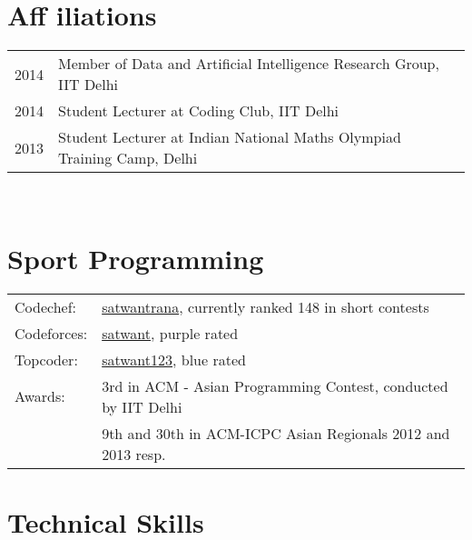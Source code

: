 \documentclass[a4paper,10pt]{article} %
\begin{document}

\section{Aff iliations}
\begin{tabular}{rl}
2014 & Member of Data and Artificial Intelligence Research Group, IIT Delhi \\
2014 & Student Lecturer at Coding Club, IIT Delhi\\
2013 & Student Lecturer at Indian National Maths Olympiad Training Camp, Delhi\\
\end{tabular}\\




\section{Sport Programming}

\begin{tabular}{ll}
Codechef: & \href{http://www.codechef.com/users/satwantrana}{satwantrana}, currently ranked 148 in short contests\\
Codeforces: & \href{http://codeforces.com/profile/satwant}{satwant}, purple rated\\
Topcoder: & \href{http://community.topcoder.com/tc?module=MemberProfile&cr=23152984}{satwant123}, blue rated\\
Awards: & 3rd in ACM - Asian Programming Contest, conducted by IIT Delhi\\
& 9th and 30th in ACM-ICPC Asian Regionals 2012 and 2013 resp.

\end{tabular}



\section{Technical Skills}
\end{document}

